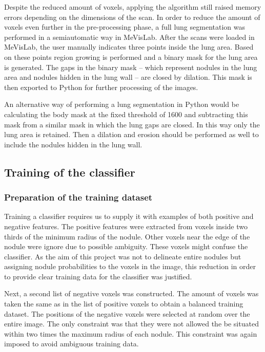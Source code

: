 Despite the reduced amount of voxels, applying the algorithm still raised memory
errors depending on the dimensions of the scan. In order to reduce the amount of
voxels even further in the pre-processing phase, a full lung segmentation was
performed in a semiautomatic way in MeVisLab. After the scans were loaded in
MeVisLab, the user manually indicates three points inside the lung area. Based
on these points region growing is performed and a binary mask for the lung area
is generated. The gaps in the binary mask -- which represent nodules in the lung
area and nodules hidden in the lung wall -- are closed by dilation. This mask is
then exported to Python for further processing of the images.

An alternative way of performing a lung segmentation in Python would be
calculating the body mask at the fixed threshold of 1600 and subtracting this
mask from a similar mask in which the lung gaps are closed. In this way only the
lung area is retained. Then a dilation and erosion should be performed as well
to include the nodules hidden in the lung wall.

\subsection{Training of the classifier}
\subsubsection{Preparation of the training dataset}
Training a classifier requires us to supply it with examples of both positive
and negative features. The positive features were extracted from voxels inside
two thirds of the minimum radius of the nodule. Other voxels near the edge of
the nodule were ignore due to possible ambiguity. These voxels might confuse the
classifier. As the aim of this project was not to delineate entire nodules but
assigning nodule probabilities to the voxels in the image, this reduction in
order to provide clear training data for the classifier was justified.

Next, a second list of negative voxels was constructed. The amount of voxels was
taken the same as in the list of positive voxels to obtain a balanced training
dataset. The positions of the negative voxels were selected at random over the
entire image. The only constraint was that they were not allowed the be situated
within two times the maximum radius of each nodule. This constraint was again
imposed to avoid ambiguous training data.


